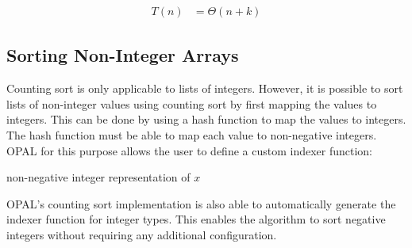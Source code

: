 \begin{equation*}
    \begin{aligned}
        T(n) &= \Theta(n + k)
    \end{aligned}
\end{equation*}

\subsection{Sorting Non-Integer Arrays}
\label{count:non-integer}

Counting sort is only applicable to lists of integers. However, it is possible to sort lists of non-integer values using counting sort by first mapping the values to integers. This can be done by using a hash function to map the values to integers. The hash function must be able to map each value to non-negative integers. OPAL for this purpose allows the user to define a custom indexer function:

\begin{algorithmic}[1]
        \State \Return non-negative integer representation of $x$
    \EndFunction
\end{algorithmic}

OPAL's counting sort implementation is also able to automatically generate the indexer function for integer types. This enables the algorithm to sort negative integers without requiring any additional configuration.

